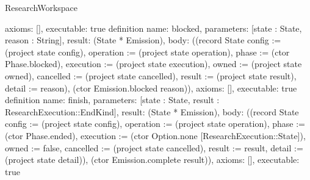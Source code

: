 \begin{lexlean}{ResearchWorkspace}
\begin{semanticmodule}
{ axioms: [],
 executable: true
}
definition{
 name: blocked,
 parameters: [state : State, reason : String],
 result: (State * Emission),
 body: ((record State {config := (project state config), operation := (project state operation), phase := (ctor Phase.blocked), execution := (project state execution), owned := (project state owned), cancelled := (project state cancelled), result := (project state result), detail := reason}), (ctor Emission.blocked reason)),
 axioms: [],
 executable: true
}
definition{
 name: finish,
 parameters: [state : State, result : ResearchExecution::EndKind],
 result: (State * Emission),
 body: ((record State {config := (project state config), operation := (project state operation), phase := (ctor Phase.ended), execution := (ctor Option.none [ResearchExecution::State]), owned := false, cancelled := (project state cancelled), result := result, detail := (project state detail)}), (ctor Emission.complete result)),
 axioms: [],
 executable: true
}


\end{semanticmodule}
\end{lexlean}
